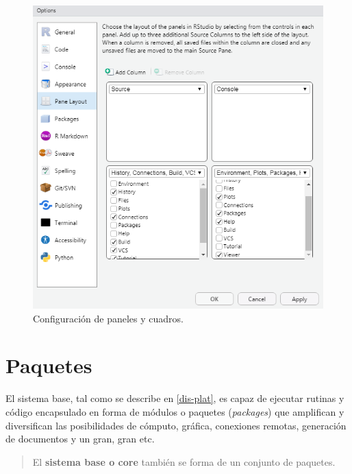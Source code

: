 \documentclass[
]{book}
\begin{document}
\begin{figure}

{\centering \includegraphics[width=8.15in]{img/ops-panes} 

}

\caption{Configuración de paneles y cuadros.}\label{fig:img-gui-op-3}
\end{figure}

\hypertarget{intro-package}{%
\chapter{\texorpdfstring{Paquetes}{Paquetes}}\label{intro-package}}

El sistema base, tal como se describe en \ref{dis-plat}, es capaz de ejecutar rutinas y código encapsulado en forma de módulos o paquetes (\emph{packages}) que amplifican y diversifican las posibilidades de cómputo, gráfica, conexiones remotas, generación de documentos y un gran, gran etc.

\begin{quote}
El \textbf{sistema base o core} también se forma de un conjunto de paquetes.
\end{quote}
\end{document}
